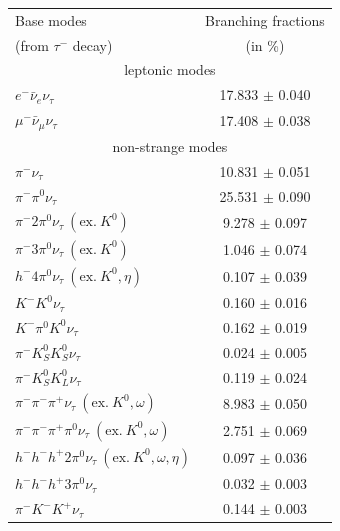 \documentclass[fleqn,twoside]{article}
\begin{document}
\begin{table}[!hbtp]
\begin{tabular}{l| c} \hline
Base       modes                                                    & Branching fractions \\ 
(from $\tau^-$ decay)                                               & (in \%)\\ \hline
\multicolumn{2}{c}{leptonic modes} \\ \hline
$e^- \bar{\nu}_e \nu_\tau$                                            & 17.833 $\pm$  0.040 \\ 
$\mu^- \bar{\nu}_\mu \nu_\tau$                                        & 17.408 $\pm$  0.038 \\ 
\hline 
\multicolumn{2}{c}{non-strange modes} \\ \hline
$\pi^- \nu_\tau$                                                      &10.831 $\pm$  0.051 \\
$\pi^- \pi^0 \nu_\tau$                                                &25.531 $\pm$  0.090 \\
$\pi^- 2\pi^0 \nu_\tau ~(\mathrm{ex.~}K^0)$                           &9.278 $\pm$ 0.097 \\ 
$\pi^- 3\pi^0 \nu_\tau ~(\mathrm{ex.~}K^0)$                           & 1.046 $\pm$ 0.074 \\ 
$h^- 4\pi^0 \nu_\tau ~(\mathrm{ex.~}K^0,\eta)$                        & 0.107 $\pm$ 0.039 \\ 
$K^- K^0 \nu_\tau$                                                    & 0.160 $\pm$ 0.016 \\ 
$K^- \pi^0 K^0 \nu_\tau$                                              & 0.162 $\pm$ 0.019 \\ 
$\pi^- K_S^0 K_S^0 \nu_\tau$                                          & 0.024 $\pm$ 0.005 \\ 
$\pi^- K_S^0 K_L^0 \nu_\tau$                                          & 0.119 $\pm$ 0.024 \\ 
$\pi^- \pi^- \pi^+ \nu_\tau ~(\mathrm{ex.~}K^0,\omega)$               & 8.983 $\pm$ 0.050 \\ 
$\pi^- \pi^- \pi^+ \pi^0 \nu_\tau ~(\mathrm{ex.~}K^0,\omega)$         & 2.751 $\pm$ 0.069 \\ 
$h^- h^- h^+ 2\pi^0 \nu_\tau ~(\mathrm{ex.~}K^0,\omega,\eta)$         & 0.097 $\pm$ 0.036 \\ 
$h^- h^- h^+ 3\pi^0 \nu_\tau$                                         & 0.032 $\pm$ 0.003 \\ 
$\pi^- K^- K^+ \nu_\tau$                                              & 0.144 $\pm$ 0.003 \\ 

\end{tabular}
\end{table}
\end{document}
